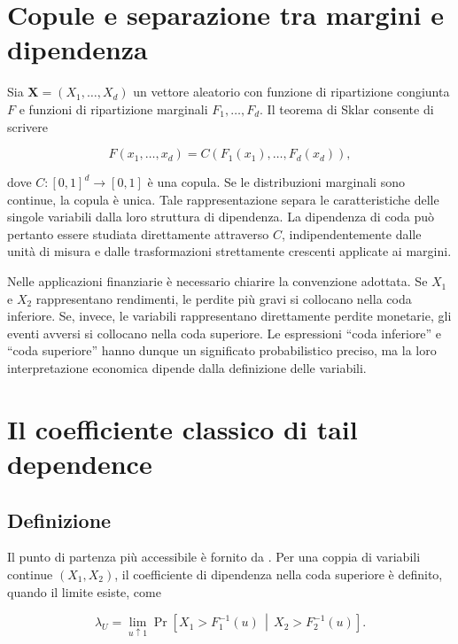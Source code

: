 \documentclass[12pt,a4paper,oneside]{book}
\begin{document}
\section{Copule e separazione tra margini e dipendenza}

Sia $\mathbf{X}=(X_1,\ldots,X_d)$ un vettore aleatorio con funzione di
ripartizione congiunta $F$ e funzioni di ripartizione marginali
$F_1,\ldots,F_d$. Il teorema di Sklar consente di scrivere

\begin{equation}
    F(x_1,\ldots,x_d)
    = C\!\left(F_1(x_1),\ldots,F_d(x_d)\right),
    \label{eq:sklar}
\end{equation}

dove $C\colon[0,1]^d\to[0,1]$ è una copula. Se le distribuzioni marginali
sono continue, la copula è unica. Tale rappresentazione separa le
caratteristiche delle singole variabili dalla loro struttura di dipendenza.
La dipendenza di coda può pertanto essere studiata direttamente attraverso
$C$, indipendentemente dalle unità di misura e dalle trasformazioni
strettamente crescenti applicate ai margini.

Nelle applicazioni finanziarie è necessario chiarire la convenzione adottata.
Se $X_1$ e $X_2$ rappresentano rendimenti, le perdite più gravi si collocano
nella coda inferiore. Se, invece, le variabili rappresentano direttamente
perdite monetarie, gli eventi avversi si collocano nella coda superiore. Le
espressioni ``coda inferiore'' e ``coda superiore'' hanno dunque un significato
probabilistico preciso, ma la loro interpretazione economica dipende dalla
definizione delle variabili.

\section{Il coefficiente classico di tail dependence}

\subsection{Definizione}

Il punto di partenza più accessibile è fornito da \textcite{schmidt2005}. Per
una coppia di variabili continue $(X_1,X_2)$, il coefficiente di dipendenza
nella coda superiore è definito, quando il limite esiste, come

\begin{equation}
    \lambda_U
    = \lim_{u\uparrow 1}
    \Pr\!\left[
        X_1>F_1^{-1}(u)
        \,\middle|\,
        X_2>F_2^{-1}(u)
    \right].
    \label{eq:lambda-upper-def}
\end{equation}
\end{document}
